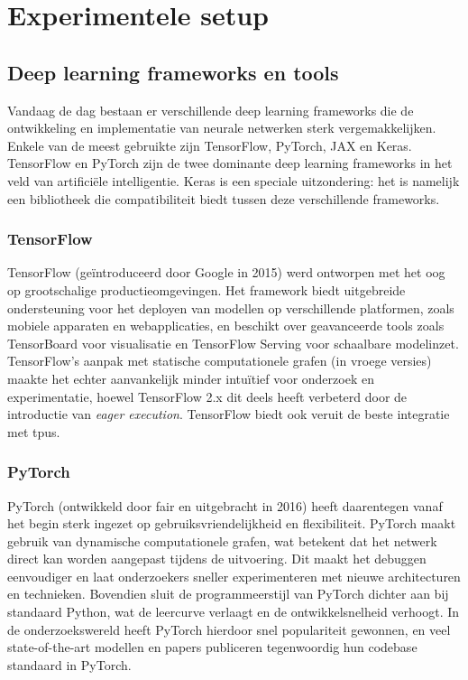 \section{Experimentele setup}

\subsection{Deep learning frameworks en tools}

Vandaag de dag bestaan er verschillende deep learning frameworks die de ontwikkeling en implementatie van neurale netwerken sterk vergemakkelijken. Enkele van de meest gebruikte zijn TensorFlow, PyTorch, JAX en Keras. TensorFlow en PyTorch zijn de twee dominante deep learning frameworks in het veld van artificiële intelligentie. Keras is een speciale uitzondering: het is namelijk een bibliotheek die compatibiliteit biedt tussen deze verschillende frameworks.

\subsubsection{TensorFlow}

TensorFlow (geïntroduceerd door Google in 2015) werd ontworpen met het oog op grootschalige productieomgevingen. Het framework biedt uitgebreide ondersteuning voor het deployen van modellen op verschillende platformen, zoals mobiele apparaten en webapplicaties, en beschikt over geavanceerde tools zoals TensorBoard voor visualisatie en TensorFlow Serving voor schaalbare modelinzet. TensorFlow’s aanpak met statische computationele grafen (in vroege versies) maakte het echter aanvankelijk minder intuïtief voor onderzoek en experimentatie, hoewel TensorFlow 2.x dit deels heeft verbeterd door de introductie van \emph{eager execution}. TensorFlow biedt ook veruit de beste integratie met \glspl{tpu}. \autocite{Pang_2019}

\subsubsection{PyTorch}

PyTorch (ontwikkeld door \gls{fair} en uitgebracht in 2016) heeft daarentegen vanaf het begin sterk ingezet op gebruiksvriendelijkheid en flexibiliteit. PyTorch maakt gebruik van dynamische computationele grafen, wat betekent dat het netwerk direct kan worden aangepast tijdens de uitvoering. Dit maakt het debuggen eenvoudiger en laat onderzoekers sneller experimenteren met nieuwe architecturen en technieken. Bovendien sluit de programmeerstijl van PyTorch dichter aan bij standaard Python, wat de leercurve verlaagt en de ontwikkelsnelheid verhoogt. In de onderzoekswereld heeft PyTorch hierdoor snel populariteit gewonnen, en veel state-of-the-art modellen en papers publiceren tegenwoordig hun codebase standaard in PyTorch. \autocite{Imambi_2021} \\

